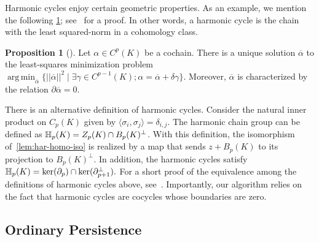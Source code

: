 \documentclass[10pt,a4paper]{amsart}
\newcommand {\mm}[1] {\ifmmode{#1}\else{\mbox{\(#1\)}}\fi}
\newcommand{\har}           {\mm{\mathbb{H}}}
\theoremstyle{definition}
\let\bar\overline
\DeclareMathOperator*{\argmin}{arg\,min}
\newtheorem{proposition}[theorem]{Proposition}
\theoremstyle{remark}
\begin{document}
Harmonic cycles enjoy certain geometric properties. As an example, we mention the following \cref{prop:uniqueness}; see~\cite[Proposition 3]{DeSilvaMorozovVejdemoJohansson2011} for a proof. In other words, a harmonic cycle is the chain with the least squared-norm in a cohomology class.

\begin{proposition}[\cite{DeSilvaMorozovVejdemoJohansson2011}]
\label{prop:uniqueness}
Let $\alpha \in C^p(K)$ be a cochain. There is a unique solution $\bar{\alpha}$ to the least-squares minimization problem 
$\argmin_{\bar{\alpha}} \{ || \bar{\alpha}||^2 \mid \exists \gamma \in C^{p-1}(K);  \alpha = \bar{\alpha}+\delta \gamma \}.$ 
Moreover, $\bar{\alpha}$ is characterized by the relation $\partial {\bar{\alpha}}=0$.
\end{proposition}

There is an alternative definition of harmonic cycles. Consider the natural inner product on $C_p(K)$ given by $\langle\sigma_i , \sigma_j\rangle = \delta_{i,j}$. The harmonic chain group can be defined as $\har_p(K) = Z_p(K) \cap B_p(K)^\perp$. With this definition, the isomorphism of~\cref{lem:har-homo-iso} is realized by a  map that sends $z+B_p(K)$ to its projection to $B_p(K)^\perp$. In addition, the harmonic cycles satisfy 
$\har_p(K) = \ker(\partial_p) \cap \ker(\partial_{p+1}^\perp).$
For a short proof of the equivalence among the definitions of harmonic cycles above, see~\cite{BasuCox2022}. 
Importantly, our algorithm relies on the fact that harmonic cycles are cocycles whose boundaries are zero. 

\subsection{Ordinary Persistence}
\label{sec:persistence}
\end{document}
